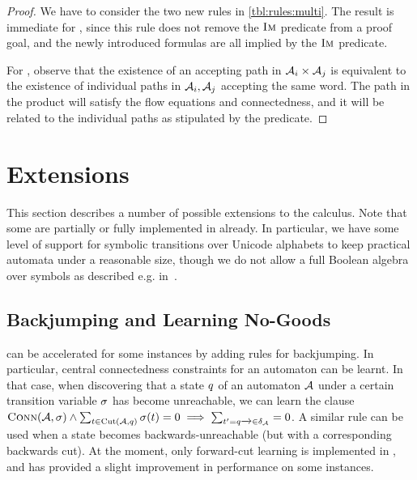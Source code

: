 \documentclass[acmsmall,review,anonymous,screen]{acmart}\settopmatter{printfolios=true,printccs=true,printacmref=true}
\theoremstyle{definition}
\begin{document}
\begin{proof}
  We have to consider the two new rules in \cref{tbl:rules:multi}. The
  result is immediate for \ExpandM{}, since this rule does not remove the
  $\operatorname{\textsc{Im}}$ predicate from a proof goal, and the newly introduced formulas
  are all implied by the $\operatorname{\textsc{Im}}$ predicate.

  For \Materialise{}, observe that the existence of an accepting path
  in $\mathcal{A}_i \times \mathcal{A}_j$ is equivalent to the existence
  of individual paths in $\mathcal{A}_i, \mathcal{A}_j$ accepting the
  same word. The path in the product will satisfy the flow equations
  and connectedness, and it will be related to the individual paths as
  stipulated by the \BindingSum{} predicate.
\end{proof}


\section{Extensions}\label{sec:extensions}

This section describes a number of possible extensions to the calculus. Note
that some are partially or fully implemented in \Catra{} already. In particular,
we have some level of support for symbolic transitions over Unicode alphabets to
keep practical automata under a reasonable size, though we do not allow a full Boolean algebra over symbols as described e.g. in~\cite{symbolic-automata}.

\subsection{Backjumping and Learning No-Goods}\label{sec:ext:backjumping}

\Calculus{} can be accelerated for some instances by adding rules for
backjumping. In particular, central connectedness constraints for an automaton
can be learnt. In that case, when discovering that a state $q$ of an
automaton $\mathcal{A}$ under a certain transition variable $\operatorname{\sigma}$ has become
unreachable, we can learn the clause $\operatorname{\textsc{Conn}}(\mathcal{A}, \operatorname{\sigma}) \land
\sum_{t \in \operatorname{Cut}(\mathcal{A}, q)} \operatorname{\sigma}(t) =
0 \implies \sum_{t' = q \xrightarrow{} \in
\delta_{\mathcal{A}}} = 0$. A similar rule can be used when a state becomes
backwards-unreachable (but with a corresponding backwards cut). At the moment,
only forward-cut learning is implemented in \Catra, and has provided a slight
improvement in performance on some instances.
\end{document}
